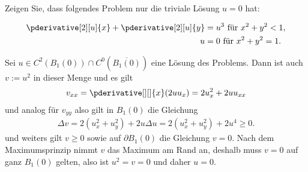 
\begin{exercise}

Zeigen Sie, dass folgendes Problem nur die triviale Lösung $u = 0$ hat:

\begin{align*}
    \pderivative[2][u]{x} + \pderivative[2][u]{y} & = u^3 ~\text{für}~ x^2 + y^2 < 1, \\
    \quad
    u & = 0 ~\text{für}~ x^2 + y^2 = 1.
\end{align*}

\end{exercise}


\begin{solution}
	Sei $u \in C^2(B_1(0)) \cap C^0(\overline{B_1(0)})$ eine Lösung des Problems.
  Dann ist auch $v := u^2$ in dieser Menge und es gilt
	\begin{align*}
	v_{xx} = \pderivative[][]{x}(2 u u_x) = 2 u_x^2 + 2 u u_{xx}
	\end{align*}
	und analog für $v_{yy}$ also gilt in $B_1(0)$ die Gleichung
	\begin{align*}
	\Delta v = 2 (u_x^2 + u_y^2) + 2 u \Delta u = 2(u_x^2 + u_y^2) + 2 u^4 \geq 0.
	\end{align*}
	und weiters gilt $v \geq 0$ sowie auf $\partial B_1(0)$ die Gleichung $v = 0$. Nach dem Maximumsprinzip nimmt $v$ das Maximum am Rand an, deshalb muss $v = 0$ auf ganz $B_1(0)$ gelten, also ist $u^2 = v = 0$ und daher $u = 0$.

\end{solution}

